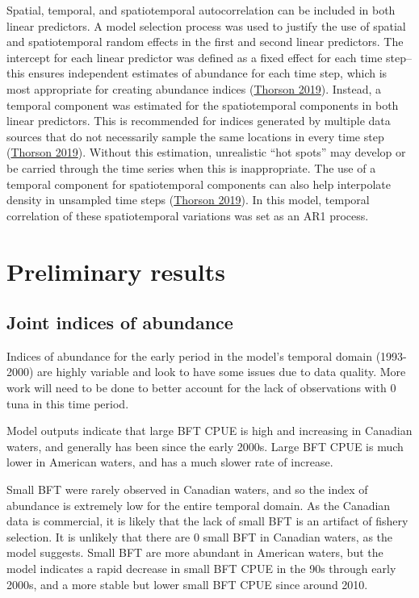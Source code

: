 \documentclass[
]{article}
\begin{document}
Spatial, temporal, and spatiotemporal autocorrelation can be included in both linear predictors. A model selection process was used to justify the use of spatial and spatiotemporal random effects in the first and second linear predictors. The intercept for each linear predictor was defined as a fixed effect for each time step-- this ensures independent estimates of abundance for each time step, which is most appropriate for creating abundance indices (\protect\hyperlink{ref-thorson_2019}{Thorson 2019}). Instead, a temporal component was estimated for the spatiotemporal components in both linear predictors. This is recommended for indices generated by multiple data sources that do not necessarily sample the same locations in every time step (\protect\hyperlink{ref-thorson_2019}{Thorson 2019}). Without this estimation, unrealistic ``hot spots'' may develop or be carried through the time series when this is inappropriate. The use of a temporal component for spatiotemporal components can also help interpolate density in unsampled time steps (\protect\hyperlink{ref-thorson_2019}{Thorson 2019}). In this model, temporal correlation of these spatiotemporal variations was set as an AR1 process.

\newpage

\hypertarget{preliminary-results}{%
\section{Preliminary results}\label{preliminary-results}}

\hypertarget{joint-indices-of-abundance}{%
\subsection{Joint indices of abundance}\label{joint-indices-of-abundance}}

Indices of abundance for the early period in the model's temporal domain (1993-2000) are highly variable and look to have some issues due to data quality. More work will need to be done to better account for the lack of observations with 0 tuna in this time period.

Model outputs indicate that large BFT CPUE is high and increasing in Canadian waters, and generally has been since the early 2000s. Large BFT CPUE is much lower in American waters, and has a much slower rate of increase.

Small BFT were rarely observed in Canadian waters, and so the index of abundance is extremely low for the entire temporal domain. As the Canadian data is commercial, it is likely that the lack of small BFT is an artifact of fishery selection. It is unlikely that there are 0 small BFT in Canadian waters, as the model suggests. Small BFT are more abundant in American waters, but the model indicates a rapid decrease in small BFT CPUE in the 90s through early 2000s, and a more stable but lower small BFT CPUE since around 2010.
\end{document}
